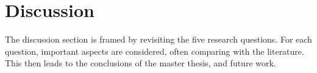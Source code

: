 \chapter{Discussion}\label{cha:discussion}



The discussion section is framed by revisiting the five research questions. For each question, important aspects are considered, often comparing with the literature. This then leads to the conclusions of the master thesis, and future work.










